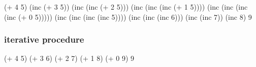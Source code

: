 \documentclass[
]{article}
\newenvironment{Shaded}{}{}
\newcommand{\DecValTok}[1]{\textcolor[rgb]{0.25,0.63,0.44}{#1}}
\newcommand{\NormalTok}[1]{#1}
\newcommand{\OperatorTok}[1]{\textcolor[rgb]{0.40,0.40,0.40}{#1}}
\begin{document}
\begin{Shaded}
\begin{Highlighting}[numbers=left,,]
\NormalTok{(}\OperatorTok{+} \DecValTok{4} \DecValTok{5}\NormalTok{)}
\NormalTok{(inc (}\OperatorTok{+} \DecValTok{3} \DecValTok{5}\NormalTok{))}
\NormalTok{(inc (inc (}\OperatorTok{+} \DecValTok{2} \DecValTok{5}\NormalTok{)))}
\NormalTok{(inc (inc (inc (}\OperatorTok{+} \DecValTok{1} \DecValTok{5}\NormalTok{))))}
\NormalTok{(inc (inc (inc (inc (}\OperatorTok{+} \DecValTok{0} \DecValTok{5}\NormalTok{)))))}
\NormalTok{(inc (inc (inc (inc }\DecValTok{5}\NormalTok{))))}
\NormalTok{(inc (inc (inc }\DecValTok{6}\NormalTok{)))}
\NormalTok{(inc (inc }\DecValTok{7}\NormalTok{))}
\NormalTok{(inc }\DecValTok{8}\NormalTok{)}
\DecValTok{9}
\end{Highlighting}
\end{Shaded}

\hypertarget{iterative-procedure}{%
\subsubsection{iterative procedure}\label{iterative-procedure}}

\begin{Shaded}
\begin{Highlighting}[numbers=left,,]
\NormalTok{(}\OperatorTok{+} \DecValTok{4} \DecValTok{5}\NormalTok{)}
\NormalTok{(}\OperatorTok{+} \DecValTok{3} \DecValTok{6}\NormalTok{)}
\NormalTok{(}\OperatorTok{+} \DecValTok{2} \DecValTok{7}\NormalTok{)}
\NormalTok{(}\OperatorTok{+} \DecValTok{1} \DecValTok{8}\NormalTok{)}
\NormalTok{(}\OperatorTok{+} \DecValTok{0} \DecValTok{9}\NormalTok{)}
\DecValTok{9}
\end{Highlighting}
\end{Shaded}
\end{document}
